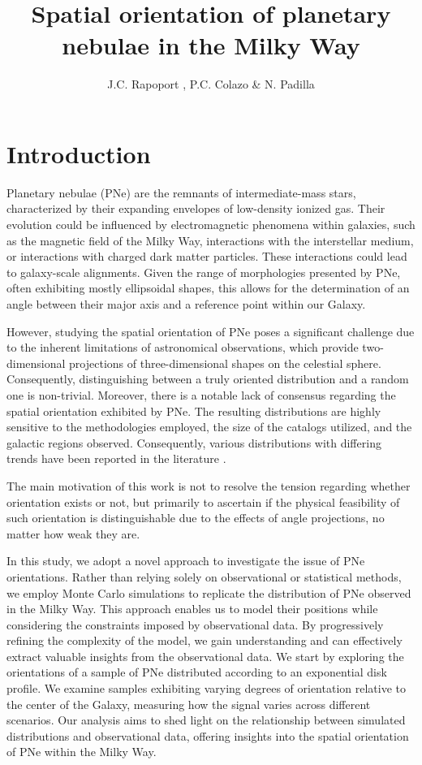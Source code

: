 \documentclass[baaa]{baaa}
\title{Spatial orientation of planetary nebulae in the Milky Way}
\author{
J.C. Rapoport\inst{1,2}
          ,
P.C. Colazo
          \inst{1,3,4}
          \&
N. Padilla
          \inst{1,3,4}
           }
\institute{
Facultad de Matemática, Astronomía, Física y Computación, UNC, Argentina\and   
Observatorio Astron\'omico de C\'ordoba, UNC, Argentina
\and
Instituto de Astronom\'ia Te\'orica y Experimental, CONICET--UNC, Argentina
\and
Consejo Nacional de Investigaciones Cient\'ificas y T\'ecnicas, Argentina
}
\begin{document}
\maketitle
\section{Introduction}
\label{S_intro}

Planetary nebulae (PNe) are the remnants of intermediate-mass stars, characterized by their expanding envelopes of low-density ionized gas. Their evolution could be influenced by electromagnetic phenomena within galaxies, such as the magnetic field of the Milky Way, interactions with the interstellar medium, or interactions with charged dark matter particles. These interactions could lead to galaxy-scale alignments.  Given the range of morphologies presented by PNe, often exhibiting mostly ellipsoidal shapes, this allows for the determination of an angle between their major axis and a reference point within our Galaxy. 

However, studying the spatial orientation of PNe poses a significant challenge due to the inherent limitations of astronomical observations, which provide two-dimensional projections of three-dimensional shapes on the celestial sphere. Consequently, distinguishing between a truly oriented distribution and a random one is non-trivial. Moreover, there is a notable lack of consensus regarding the spatial orientation exhibited by PNe. The resulting distributions are highly sensitive to the methodologies employed, the size of the catalogs utilized, and the galactic regions observed. Consequently, various distributions with differing trends have been reported in the literature \citep{1968IAUS...34..287G,1975MNRAS.171..441M,1998MNRAS.297..617C,2008PASP..120..380W,2012A&A...541A..98A}.

The main motivation of this work is not to resolve the tension regarding whether
orientation exists or not, but primarily to ascertain if the physical feasibility of such orientation is
distinguishable due to the effects of angle projections, no matter how weak they are.

In this study, we adopt a novel approach to investigate the issue of PNe orientations. Rather than relying solely on observational or statistical methods, we employ Monte Carlo simulations to replicate the distribution of PNe observed in the Milky Way. This approach enables us to model their positions while considering the constraints imposed by observational data. By progressively refining the complexity of the model, we gain understanding and can effectively extract valuable insights from the observational data. We start by exploring the orientations of a sample of PNe distributed according to an exponential disk profile. We examine samples exhibiting varying degrees of orientation relative to the center of the Galaxy, measuring how the signal varies across different scenarios. Our analysis aims to shed light on the relationship between simulated distributions and observational data, offering insights into the spatial orientation of PNe within the Milky Way. 
\end{document}
